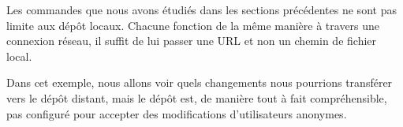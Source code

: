 Les commandes que nous avons étudiés dans les sections précédentes
ne sont pas limite aux dépôt locaux. Chacune fonction de la même
manière à travers une connexion réseau, il suffit de lui passer une 
URL et non un chemin de fichier local.

Dans cet exemple, nous allons voir quels changements nous pourrions
transférer vers le dépôt distant, mais le dépôt est, de manière tout
à fait compréhensible, pas configuré pour accepter des modifications
d'utilisateurs anonymes.

